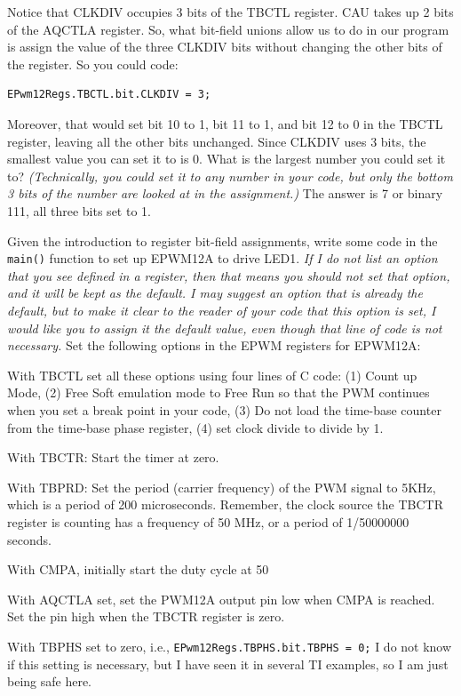 \documentclass[11pt]{article}
\begin{document}
%
Notice that CLKDIV occupies 3 bits of the TBCTL register. CAU takes up 2 bits of the AQCTLA register. So, what bit-field unions allow us to do in our program is assign the value of the three CLKDIV bits without changing the other bits of the register. So you could code:
%
\begin{verbatim}
EPwm12Regs.TBCTL.bit.CLKDIV = 3;
\end{verbatim}
%
Moreover, that would set bit 10 to 1, bit 11 to 1, and bit 12 to 0 in the TBCTL register, leaving all the other bits unchanged. Since CLKDIV uses 3 bits, the smallest value you can set it to is 0. What is the largest number you could set it to? \textit{(Technically, you could set it to any number in your code, but only the bottom 3 bits of the number are looked at in the assignment.)}  The answer is 7 or binary 111, all three bits set to 1.

Given the introduction to register bit-field assignments, write some code in the \texttt{main()} function to set up EPWM12A to drive LED1. \textit{If I do not list an option that you see defined in a register, then that means you should not set that option, and it will be kept as the default. I may suggest an option that is already the default, but to make it clear to the reader of your code that this option is set, I would like you to assign it the default value, even though that line of code is not necessary.} Set the following options in the EPWM registers for EPWM12A:

With TBCTL set all these options using four lines of C code: (1) Count up Mode, (2) Free Soft emulation mode to Free Run so that the PWM continues when you set a break point in your code, (3) Do not load the time-base counter from the time-base phase register, (4) set clock divide to divide by 1.

With TBCTR: Start the timer at zero.

With TBPRD: Set the period (carrier frequency) of the PWM signal to 5KHz, which is a period of 200 microseconds. Remember, the clock source the TBCTR register is counting has a frequency of 50 MHz, or a period of 1/50000000 seconds.

With CMPA, initially start the duty cycle at 50%

With AQCTLA set, set the PWM12A output pin low when CMPA is reached. Set the pin high when the TBCTR register is zero.

With TBPHS set to zero, i.e., \texttt{EPwm12Regs.TBPHS.bit.TBPHS = 0;} I do not know if this setting is necessary, but I have seen it in several TI examples, so I am just being safe here.
\end{document}
